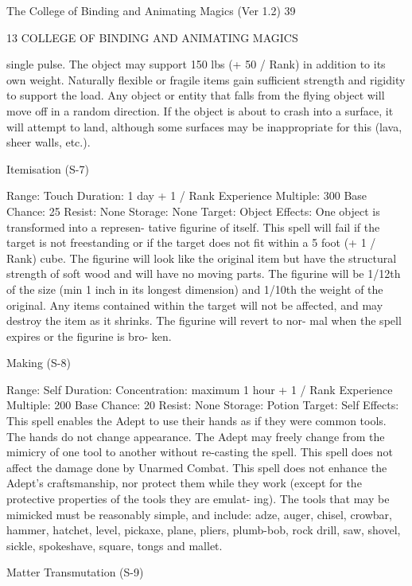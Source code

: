 \begin{Chapter}{The College of Binding and Animating Magics (Ver 1.2)}
39 

13 COLLEGE OF BINDING AND ANIMATING MAGICS 

single pulse. The object may support 150 lbs (+ 50 
/  Rank)  in  addition  to  its  own  weight.  Naturally 
flexible or fragile items gain sufficient strength and 
rigidity  to  support  the  load.  Any  object  or  entity 
that falls from the flying object  will  move off in a 
random  direction.  If  the  object  is  about  to  crash 
into  a  surface,  it  will  attempt  to  land,  although 
some  surfaces  may  be  inappropriate  for  this  (lava, 
sheer walls, etc.). 

Itemisation (S-7) 

Range: Touch 
Duration: 1 day + 1 / Rank 
Experience Multiple: 300 
Base Chance: 25%
Resist: None 
Storage: None 
Target: Object 
Effects: One object is transformed into a represen-
tative  figurine  of  itself.  This  spell  will  fail  if  the 
target is not freestanding or if the target does not fit 
within a 5 foot (+ 1 / Rank) cube. The figurine will 
look  like  the  original  item  but  have  the  structural 
strength  of  soft  wood  and  will  have  no  moving 
parts. The figurine will be 1/12th of the size (min 1 
inch  in  its  longest  dimension)  and  1/10th  the 
weight of the original. Any items contained within 
the target will not be affected, and may destroy the 
item  as  it  shrinks.  The  figurine  will  revert  to  nor-
mal  when  the  spell  expires  or  the  figurine  is  bro-
ken. 

Making (S-8) 

Range: Self 
Duration:  Concentration:  maximum  1  hour  +  1  / 
Rank 
Experience Multiple: 200 
Base Chance: 20%
Resist: None 
Storage: Potion 
Target: Self 
Effects:  This  spell  enables  the  Adept  to  use  their 
hands as if they were common tools. The hands do 
not  change  appearance.  The  Adept  may  freely 
change  from  the  mimicry  of  one  tool  to  another 
without  re-casting  the  spell.  This  spell  does  not 
affect the damage done by Unarmed Combat. This 
spell  does  not  enhance  the  Adept’s  craftsmanship, 
nor  protect  them  while  they  work  (except  for  the 
protective  properties  of  the  tools  they  are  emulat-
ing).  The  tools  that  may  be  mimicked  must  be 
reasonably simple, and include: adze, auger, chisel, 
crowbar,  hammer,  hatchet,  level,  pickaxe,  plane, 
pliers,  plumb-bob,  rock  drill,  saw,  shovel,  sickle, 
spokeshave, square, tongs and mallet. 

Matter Transmutation (S-9) 


\end{Chapter}
